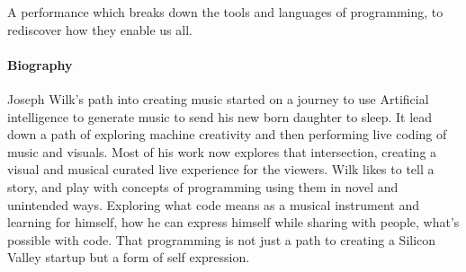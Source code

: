 \documentclass[sigplan,10pt]{acmart}\settopmatter{}
\begin{document}
A performance which breaks down the tools and languages of
programming, to rediscover how they enable us all.

\paragraph{Biography}
Joseph Wilk's path into creating music started on a journey to use Artificial
intelligence to generate music to send his new born daughter to
sleep. It lead down a path of exploring machine creativity and then
performing live coding of music and visuals. Most of his work now
explores that intersection, creating a visual and musical curated live
experience for the viewers. Wilk likes to tell a story, and play with
concepts of programming using them in novel and unintended
ways. Exploring what code means as a musical instrument and learning
for himself, how he can express himself while sharing with people, what's
possible with code. That programming is not just a path to creating a
Silicon Valley startup but a form of self expression.


\end{document}
